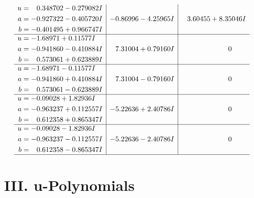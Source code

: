 \documentclass[1p]{elsarticle_modified}
\theoremstyle{definition}
\begin{document}
$$\begin{array}{c|c|c}
\begin{aligned}
u &= \phantom{-}0.348702 - 0.279082 I \\
a &= -0.927322 - 0.405720 I \\
b &= -0.401495 + 0.966747 I\end{aligned}
 & -0.86996 - 4.25965 I & \phantom{-}3.60455 + 8.35046 I \\ \hline\begin{aligned}
u &= -1.68971 + 0.11577 I \\
a &= -0.941860 - 0.410884 I \\
b &= \phantom{-}0.573061 + 0.623889 I\end{aligned}
 & \phantom{-}7.31004 + 0.79160 I & \phantom{-0.000000 } 0 \\ \hline\begin{aligned}
u &= -1.68971 - 0.11577 I \\
a &= -0.941860 + 0.410884 I \\
b &= \phantom{-}0.573061 - 0.623889 I\end{aligned}
 & \phantom{-}7.31004 - 0.79160 I & \phantom{-0.000000 } 0 \\ \hline\begin{aligned}
u &= -0.09028 + 1.82936 I \\
a &= -0.963237 + 0.112557 I \\
b &= \phantom{-}0.612358 + 0.865347 I\end{aligned}
 & -5.22636 + 2.40786 I & \phantom{-0.000000 } 0 \\ \hline\begin{aligned}
u &= -0.09028 - 1.82936 I \\
a &= -0.963237 - 0.112557 I \\
b &= \phantom{-}0.612358 - 0.865347 I\end{aligned}
 & -5.22636 - 2.40786 I & \phantom{-0.000000 } 0\\
 \hline 
 \end{array}$$\newpage
\newpage\renewcommand{\arraystretch}{1}
\centering \section*{ III. u-Polynomials}
\end{document}
